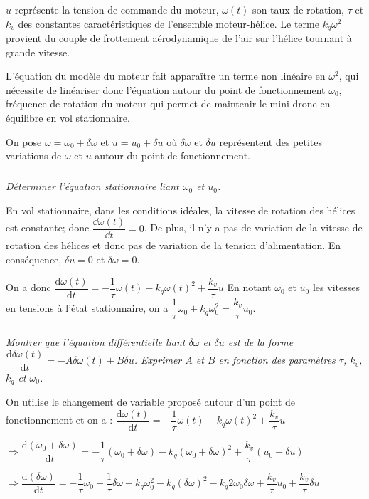 \begin{multicols}{2}
$u$ représente la tension de commande du moteur, $\omega(t)$ son taux de rotation, $\tau$ et $k_v$ des constantes caractéristiques de l'ensemble moteur-hélice. Le terme $k_q\omega^2$ provient du couple de frottement aérodynamique de l'air sur l'hélice tournant à grande vitesse.

L'équation du modèle du moteur fait apparaître un terme non linéaire en $\omega^2$, qui nécessite de linéariser
donc l'équation autour du point de fonctionnement $\omega_0$, fréquence de rotation du moteur qui permet de
maintenir le mini-drone en équilibre en vol stationnaire.

On pose $\omega=\omega_0+\delta \omega$ et $u=u_0+\delta u$ où $\delta\omega$ et $\delta u$ représentent des petites variations de $\omega$ et $u$ autour du point de fonctionnement.

\subparagraph{}\textit{Déterminer l’équation stationnaire liant $\omega_0$ et $u_0$.}
\ifprof
\begin{corrige}
En vol stationnaire, dans les conditions idéales, la vitesse de rotation des hélices est constante; donc $\dfrac{\dd \omega(t)}{\dd t} = 0$. De plus, il n'y a pas de variation de la vitesse de rotation des hélices et donc pas de variation de la tension d'alimentation. En conséquence, $\delta u =0$ et $\delta \omega = 0$.

On a donc 
$
\dfrac{\text{d}\omega(t)}{\text{d}t}=-\dfrac{1}{\tau}\omega(t) -k_q\omega(t)^2 + \dfrac{k_v}{\tau}u $ 
En notant $\omega_0$ et $u_0$ les vitesses en tensions à l'état stationnaire, on a 
$\dfrac{1}{\tau}\omega_0 +k_q\omega_0^2 = \dfrac{k_v}{\tau}u_0$.

\end{corrige}
\else
\fi
\subparagraph{}\textit{Montrer que l'équation différentielle liant $\delta \omega$ et $\delta u$ est de la forme $\dfrac{\text{d}\delta \omega(t) }{\text{d}t}=-A\delta \omega(t) + B \delta u$. Exprimer $A$ et $B$ en fonction des paramètres $\tau$, $k_v$, $k_q$ et $\omega_0$.}
\ifprof
\begin{corrige}
On utilise le changement de variable proposé autour d'un point de fonctionnement et on a : 
$
\dfrac{\text{d}\omega(t)}{\text{d}t}=-\dfrac{1}{\tau}\omega(t) -k_q\omega(t)^2 + \dfrac{k_v}{\tau}u
$

$
\Rightarrow 
\dfrac{\text{d}\left( \omega_0+\delta \omega \right)}{\text{d}t}=-\dfrac{1}{\tau}\left( \omega_0+\delta \omega\right) -k_q\left( \omega_0+\delta\omega \right)^2 + \dfrac{k_v}{\tau}\left( u_0+\delta u\right)
$

$
\Rightarrow 
\dfrac{\text{d}\left(\delta \omega \right)}{\text{d}t}=-\dfrac{1}{\tau} \omega_0-\dfrac{1}{\tau}\delta \omega -k_q \omega_0^2-k_q\left(\delta\omega\right)^2 -k_q2 \omega_0 \delta\omega + \dfrac{k_v}{\tau} u_0+\dfrac{k_v}{\tau} \delta u
$


\end{corrige}
\end{multicols}

